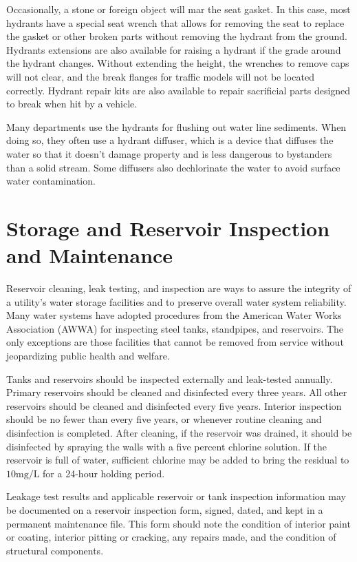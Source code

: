 \documentclass[10pt]{article}
\begin{document}
Occasionally, a stone or foreign object will mar the seat gasket. In this case, most hydrants have a special seat wrench that allows for removing the seat to replace the gasket or other broken parts without removing the hydrant from the ground. Hydrants extensions are also available for raising a hydrant if the grade around the hydrant changes. Without extending the height, the wrenches to remove caps will not clear, and the break flanges for traffic models will not be located correctly. Hydrant repair kits are also available to repair sacrificial parts designed to break when hit by a vehicle.

Many departments use the hydrants for flushing out water line sediments. When doing so, they often use a hydrant diffuser, which is a device that diffuses the water so that it doesn't damage property and is less dangerous to bystanders than a solid stream. Some diffusers also dechlorinate the water to avoid surface water contamination.

\section{Storage and Reservoir Inspection and Maintenance}
Reservoir cleaning, leak testing, and inspection are ways to assure the integrity of a utility's water storage facilities and to preserve overall water system reliability. Many water systems have adopted procedures from the American Water Works Association (AWWA) for inspecting steel tanks, standpipes, and reservoirs. The only exceptions are those facilities that cannot be removed from service without jeopardizing public health and welfare.

Tanks and reservoirs should be inspected externally and leak-tested annually. Primary reservoirs should be cleaned and disinfected every three years. All other reservoirs should be cleaned and disinfected every five years. Interior inspection should be no fewer than every five years, or whenever routine cleaning and disinfection is completed. After cleaning, if the reservoir was drained, it should be disinfected by spraying the walls with a five percent chlorine solution. If the reservoir is full of water, sufficient chlorine may be added to bring the residual to $10 \mathrm{mg} / \mathrm{L}$ for a 24-hour holding period.

Leakage test results and applicable reservoir or tank inspection information may be documented on a reservoir inspection form, signed, dated, and kept in a permanent maintenance file. This form should note the condition of interior paint or coating, interior pitting or cracking, any repairs made, and the condition of structural components.
\end{document}
